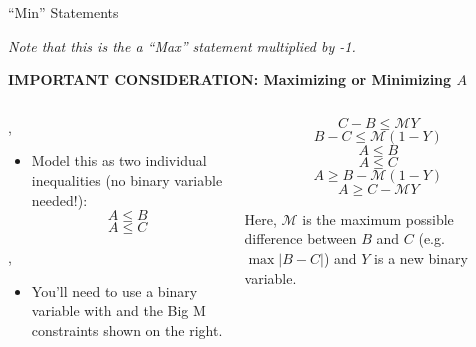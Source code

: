 \documentclass[10pt, aspectratio=169]{beamer}
\begin{document}
\begin{frame}[t]{\enquote{Min} Statements}
    \begin{center}
        \textit{Note that this is the a \enquote{Max} statement multiplied by -1.}

        \textbf{IMPORTANT CONSIDERATION: Maximizing or Minimizing $A$}
    \end{center}
    \begin{columns}[t]
        \begin{column}[t]{0.5\textwidth}
            \vspace{-.8cm}
            \begin{center}
                ,
                \underbar{}
            \end{center}
            \vspace{-0.4cm}
            \begin{itemize}
                \item Model this as two individual inequalities (no binary variable needed!):
                $$A \leq B$$
                $$A \leq C$$
            \end{itemize}
            \begin{center}
                ,
            \end{center}
            \begin{itemize}
                \item You'll need to use a binary variable with and the Big M constraints shown on the right.
            \end{itemize}
        \end{column}
        \begin{column}[t]{0.5\textwidth}
                $$C - B \leq \mathcal{M} Y$$
                $$B - C \leq \mathcal{M} (1-Y)$$
                $$A \leq B$$
                $$A \leq C$$
                $$A \geq B - \mathcal{M}(1-Y)$$
                $$A \geq C - \mathcal{M}Y$$

                Here, $\mathcal{M}$ is the maximum possible difference between $B$ and $C$ (e.g. $\max{\left|B-C\right|}$) and $Y$ is a new binary variable.
        \end{column}
    \end{columns}
\end{frame}
\end{document}
